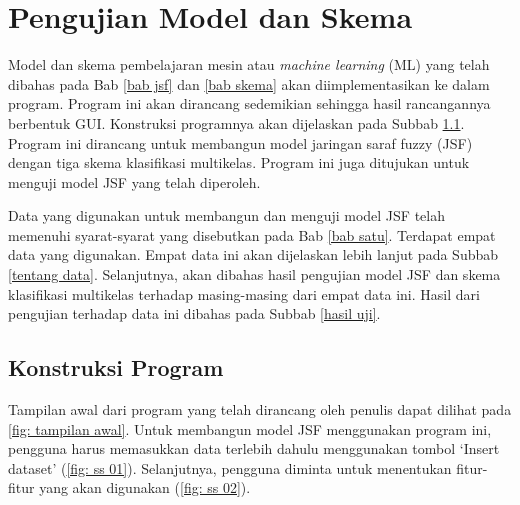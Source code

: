 \vspace{15cm}
\chapter{Pengujian Model dan Skema} \label{bab uji}

\noindent Model dan skema pembelajaran mesin atau \emph{machine learning} (ML) yang telah dibahas pada Bab \ref{bab jsf} dan \ref{bab skema} akan diimplementasikan ke dalam program. Program ini akan dirancang sedemikian sehingga hasil rancangannya berbentuk GUI. Konstruksi programnya akan dijelaskan pada Subbab \ref{konst program}. Program ini dirancang untuk membangun model jaringan saraf fuzzy (JSF) dengan tiga skema klasifikasi multikelas. Program ini juga ditujukan untuk menguji model JSF yang telah diperoleh.

\noindent Data yang digunakan untuk membangun dan menguji model JSF telah memenuhi syarat-syarat yang disebutkan pada Bab \ref{bab satu}. Terdapat empat data yang digunakan. Empat data ini akan dijelaskan lebih lanjut pada Subbab \ref{tentang data}. Selanjutnya, akan dibahas hasil pengujian model JSF dan skema klasifikasi multikelas terhadap masing-masing dari empat data ini. Hasil dari pengujian terhadap data ini dibahas pada Subbab \ref{hasil uji}.

\section{Konstruksi Program} \label{konst program}
\noindent Tampilan awal dari program yang telah dirancang oleh penulis dapat dilihat pada \ref{fig: tampilan awal}. Untuk membangun model JSF menggunakan program ini, pengguna harus memasukkan data terlebih dahulu menggunakan tombol `\colorbox{gray!30}{Insert dataset}' (\ref{fig: ss 01}). Selanjutnya, pengguna diminta untuk menentukan fitur-fitur yang akan digunakan (\ref{fig: ss 02}).


